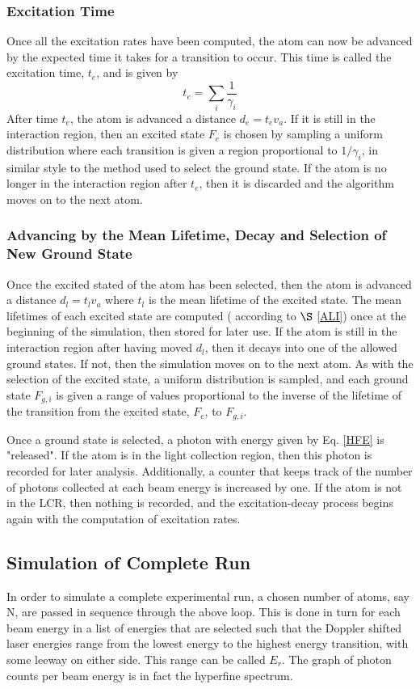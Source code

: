 \subsubsection{Excitation Time}
Once all the excitation rates have been computed, the atom can now be advanced by the expected time it takes for a transition to occur. This time is called the excitation time, $t_e$, and is given by
\begin{equation}
t_e = \sum_i \frac{1}{\gamma_i}
\end{equation}
After time $t_e$, the atom is advanced a distance $d_e = t_ev_a$. If it is still in the interaction region, then an excited state $F_e$ is chosen by sampling a uniform distribution where each transition is given a region proportional to $1/\gamma_i$, in similar style to the method used to select the ground state. If the atom is no longer in the interaction region after $t_e$, then it is discarded and the algorithm moves on to the next atom.

\subsubsection{Advancing by the Mean Lifetime, Decay and Selection of New Ground State}
Once the excited stated of the atom has been selected, then the atom is advanced a distance $d_l = t_lv_a$ where $t_l$ is the mean lifetime of the excited state. The mean lifetimes of each excited state are computed ( according to $\S$ \ref{ALI}) once at the beginning of the simulation, then stored for later use. If the atom is still in the interaction region after having moved $d_l$, then it decays into one of the allowed ground states. If not, then the simulation moves on to the next atom. As with the selection of the excited state, a uniform distribution is sampled, and each ground state $F_{g,i}$ is given a range of values proportional to the inverse of the lifetime of the transition from the excited state, $F_{e}$, to $F_{g,i}$. 

Once a ground state is selected, a photon with energy given by Eq. \ref{HFE} is "released". If the atom is in the light collection region, then this photon is recorded for later analysis. Additionally, a counter that keeps track of the number of photons collected at each beam energy is increased by one. If the atom is not in the LCR, then nothing is recorded, and the excitation-decay process begins again with the computation of excitation rates.

\subsection{Simulation of Complete Run}
In order to simulate a complete experimental run, a chosen number of atoms, say N, are passed in sequence through the above loop. This is done in turn for each beam energy in a list of energies that are selected such that the Doppler shifted laser energies range from the lowest energy to the highest energy transition, with some leeway on either side. This range can be called $E_r$. The graph of photon counts per beam energy is in fact the hyperfine spectrum.


